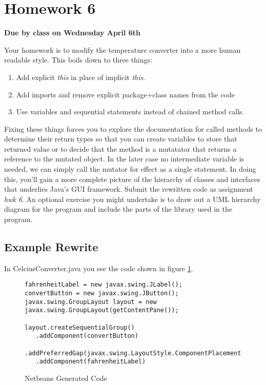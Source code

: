 \documentclass[]{tufte-handout}
\begin{document}
\section{Homework 6}

\begin{center}
\textbf{Due by class on Wednesday April 6th}
\end{center}

Your homework is to modify the temperature converter into a more human readable style. This boils down to three things:
\begin{enumerate}
\item Add explicit \textit{this} in place of implicit \textit{this}.
\item Add imports and remove explicit package+class names from the code
\item Use variables and sequential statements instead of chained method calls.
\end{enumerate}
Fixing these things forces you to explore the documentation for called methods to determine their return types so that you can create variables to store that returned value or to decide that the method is a mutatator that returns a reference to the mutated object. In the later case no intermediate variable is needed, we can simply call the mutator for effect as a single statement.  In doing this, you'll gain a more complete picture of the hierarchy of classes and interfaces that underlies Java's GUI framework. Submit the rewritten code as assignment \textit{hwk 6}. An optional exercise you might undertake is to draw out a UML hierarchy diagram for the program and include the parts of the library used in the program. 


\subsection*{Example Rewrite}

In CelciusConverter.java you see the code shown in figure \ref{orig}.
\begin{figure}[ht]
\begin{lstlisting}
fahrenheitLabel = new javax.swing.JLabel();
convertButton = new javax.swing.JButton();
javax.swing.GroupLayout layout = new javax.swing.GroupLayout(getContentPane());

layout.createSequentialGroup()
   .addComponent(convertButton)
   .addPreferredGap(javax.swing.LayoutStyle.ComponentPlacement.RELATED)
   .addComponent(fahrenheitLabel)
\end{lstlisting}
\label{orig}
\caption{Netbeans Generated Code}
\end{figure}
\end{document}
